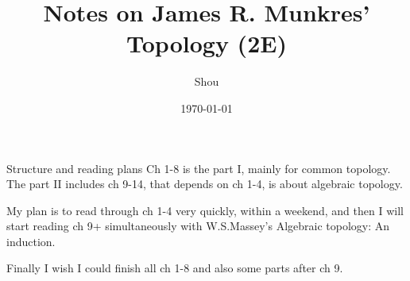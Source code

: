 \documentclass{report}
\theoremstyle{definition}
\begin{document}
\title{Notes on James R. Munkres' Topology (2E)}
\author{Shou}
\date{\today}

\maketitle
\tableofcontents

\def\T{\mathcal{T}}

\setcounter{chapter}{-1}
\begin{chapter}{Structure and reading plans}
  Ch 1-8 is the part I, mainly for common topology. The part II includes
  ch 9-14, that depends on ch 1-4, is about algebraic topology.

  My plan is to read through ch 1-4 very quickly, within a weekend, and
  then I will start reading ch 9+ simultaneously with W.S.Massey's
  Algebraic topology: An induction.

  Finally I wish I could finish all ch 1-8 and also some parts after ch 9.
\end{chapter}
\end{document}
